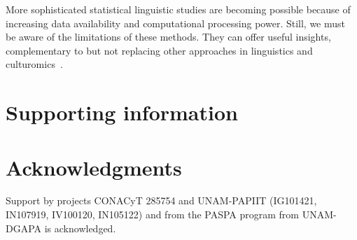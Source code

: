 \documentclass[10pt,letterpaper]{article} %
\begin{document}
More sophisticated statistical linguistic studies are becoming possible because of increasing data availability and computational processing power. Still, we must be aware of the limitations of these methods. They can offer useful insights, complementary to but not replacing other approaches in linguistics and culturomics~\cite{Michel14012011,doi:10.1073/pnas.2102061118}.

\section*{Supporting information} %
\section*{Acknowledgments} %

\nolinenumbers

Support by projects CONACyT 285754 and UNAM-PAPIIT (IG101421, IN107919, IV100120, IN105122) and from the PASPA program from UNAM-DGAPA is acknowledged. 
 
\end{document}
